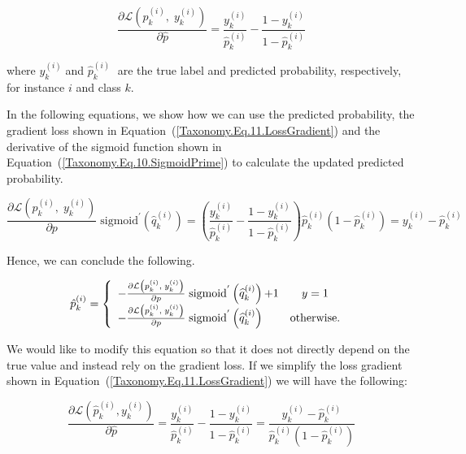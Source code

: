 \documentclass[preprint,3p,times, review]{elsarticle}
\begin{document}
\begin{equation}
    \label{Taxonomy.Eq.11.LossGradient}
    \frac{\partial \mathcal{L} \left( \widehat{p}_k^{(i)},\;y_k^{(i)}\right)}{\partial \widehat{p}}=\frac{y_k^{(i)}}{\widehat{p}_k^{(i)}}-\frac{1-y_k^{(i)}}{1-\widehat{p}_k^{(i)}}
\end{equation}


where $y_k^{(i)}\; $and ${\widehat p}_k^{(i)}\; $ are the true label and predicted probability, respectively, for instance $i $ and class $k $.

In the following equations, we show how we can use the predicted probability, the gradient loss shown in Equation~(\ref{Taxonomy.Eq.11.LossGradient}) and the derivative of the sigmoid function shown in Equation~(\ref{Taxonomy.Eq.10.SigmoidPrime}) to calculate the updated predicted probability.


\begin{equation}
\label{Taxonomy.Eq.12.NewPredElement}
\frac{\partial \mathcal{L}\left(p_k^{(i)},\; y_k^{(i)}\right)}{\partial p}\;\text{sigmoid}^{'}\left(\widehat{q}_k^{(i)}\right)=\left(\frac{y_k^{(i)}}{\widehat{p}_k^{(i)}}-\frac{1-y_k^{(i)}}{1-\widehat{p}_k^{(i)}}\right)\widehat{p}_k^{(i)}\left(1-\widehat{p}_k^{(i)}\right)=y_k^{(i)}-\widehat{p}_k^{(i)}
\end{equation}

Hence, we can conclude the following.

\begin{equation}
    \label{Taxonomy.Eq.13.NewPred}
    \begin{array}{@{}l}\hat{p}_{k}^{(i)} = \left\{\begin{array}{lc}-\frac{\partial \mathcal{L}\left(p_k^{(i)},\;y_k^{(i)}\right)}{\partial p}\;\text{sigmoid}^{'}\left(\widehat{q}_k^{(i)}\right)\text{+1}&y=1\\-\frac{\partial \mathcal{L}\left(p_k^{(i)},\;y_k^{(i)}\right)}{\partial p}\;\text{sigmoid}^{'}\left(\widehat{q}_k^{(i)}\right) & \text{otherwise.} \end{array}\right.\end{array}
\end{equation}

We would like to modify this equation so that it does not directly depend on the true value and instead rely on the gradient loss. If we simplify the loss gradient shown in Equation~(\ref{Taxonomy.Eq.11.LossGradient})  we will have the following:

\begin{equation}
    \label{Taxonomy.Eq.14.NewLossGradient}
    \frac{\partial \mathcal{L}(\widehat{p}_k^{(i)}, y_k^{(i)})}{\partial \widehat{p}} = \frac{y_k^{(i)}}{\widehat{p}_k^{(i)}} - \frac{1 - y_k^{(i)}}{1 - \widehat{p}_k^{(i)}} = \frac{y_k^{(i)} - \widehat{p}_k^{(i)}}{\widehat{p}_k^{(i)}(1 - \widehat{p}_k^{(i)})}
\end{equation}
\end{document}
